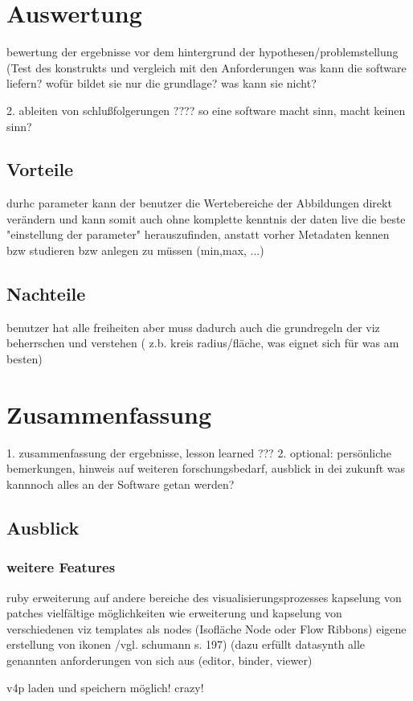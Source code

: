 \documentclass[a4paper, 12pt, onepage, pdftex, headsepline, footsepline]{scrreprt}
\begin{document}
\chapter{Auswertung}
bewertung der ergebnisse vor dem hintergrund der hypothesen/problemstellung (Test des konstrukts und vergleich mit den Anforderungen
was kann die software liefern? wofür bildet sie nur die grundlage? was kann sie nicht?

2. ableiten von schlußfolgerungen
????
so eine software macht sinn, macht keinen sinn?
\section{Vorteile}
durhc parameter kann der benutzer die Wertebereiche der Abbildungen direkt verändern und kann somit auch ohne komplette kenntnis der daten live die beste "einstellung der parameter" herauszufinden, anstatt vorher Metadaten kennen bzw studieren bzw anlegen zu müssen (min,max, ...)
\section{Nachteile}
benutzer hat alle freiheiten aber muss dadurch auch die grundregeln der viz beherrschen und verstehen ( z.b. kreis radius/fläche, was eignet sich für was am besten)

\chapter{Zusammenfassung}
1. zusammenfassung der ergebnisse, lesson learned
???
2. optional: persönliche bemerkungen, hinweis auf weiteren forschungsbedarf, ausblick in dei zukunft
was kannnoch alles an der Software getan werden?
\section{Ausblick}
\subsection{weitere Features}
ruby
erweiterung auf andere bereiche des visualisierungsprozesses
kapselung von patches
  vielfältige möglichkeiten wie
    erweiterung und kapselung von verschiedenen viz templates als nodes (Isofläche Node oder Flow Ribbons)
    eigene erstellung von ikonen /vgl. schumann s. 197)
    (dazu erfüllt datasynth alle genannten anforderungen von sich aus (editor, binder, viewer)

v4p laden und speichern möglich! crazy!
\end{document}
